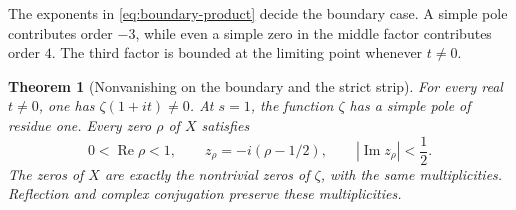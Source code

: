 \documentclass[11pt]{article}
\newtheorem{theorem}{Theorem}[section]
\theoremstyle{definition}
\theoremstyle{remark}
\numberwithin{equation}{section}
\begin{document}
The exponents in \eqref{eq:boundary-product} decide the boundary case.
A simple pole contributes order $-3$, while even a simple zero in the
middle factor contributes order $4$.
The third factor is bounded at the limiting point whenever $t\ne0$.

\begin{theorem}[Nonvanishing on the boundary and the strict strip]
\label{thm:strict-strip}
For every real $t\ne0$, one has $\zeta(1+it)\ne0$.
At $s=1$, the function $\zeta$ has a simple pole of residue one.
Every zero $\rho$ of $X$ satisfies
\begin{equation}
 0<\operatorname{Re}\rho<1,
 \qquad
 z_\rho=-i(\rho-1/2),
 \qquad
 |\operatorname{Im}z_\rho|<\frac12.
 \label{eq:strict-strip}
\end{equation}
The zeros of $X$ are exactly the nontrivial zeros of $\zeta$, with
the same multiplicities.
Reflection and complex conjugation preserve these multiplicities.
\end{theorem}
\end{document}
